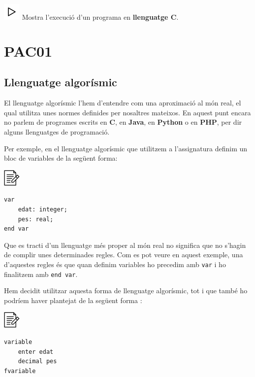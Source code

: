 \documentclass[]{book}
\begin{document}
\includegraphics{./img/play.png} Mostra l'execució d'un programa en \textbf{llenguatge C}.

\hypertarget{pac01}{%
\chapter{PAC01}\label{pac01}}

\hypertarget{llenguatge-algorismic}{%
\section{Llenguatge algorísmic}\label{llenguatge-algorismic}}

El llenguatge algorísmic l'hem d'entendre com una aproximació al món real, el qual utilitza unes normes definides per nosaltres mateixos. En aquest punt encara no parlem de programes escrits en \textbf{C}, en \textbf{Java}, en \textbf{Python} o en \textbf{PHP}, per dir alguns llenguatges de programació.

Per exemple, en el llenguatge algorísmic que utilitzem a l'assignatura definim un bloc de variables de la següent forma:

\includegraphics{./img/alg.png}

\begin{verbatim}
var
    edat: integer;
    pes: real;
end var
\end{verbatim}

Que es tracti d'un llenguatge més proper al món real no significa que no s'hagin de complir unes determinades regles. Com es pot veure en aquest exemple, una d'aquestes regles és que quan definim variables ho precedim amb \texttt{var} i ho finalitzem amb \texttt{end\ var}.

Hem decidit utilitzar aquesta forma de llenguatge algorísmic, tot i que també ho podríem haver plantejat de la següent forma :

\includegraphics{./img/alg.png}

\begin{verbatim}
variable
    enter edat
    decimal pes
fvariable
\end{verbatim}
\end{document}
